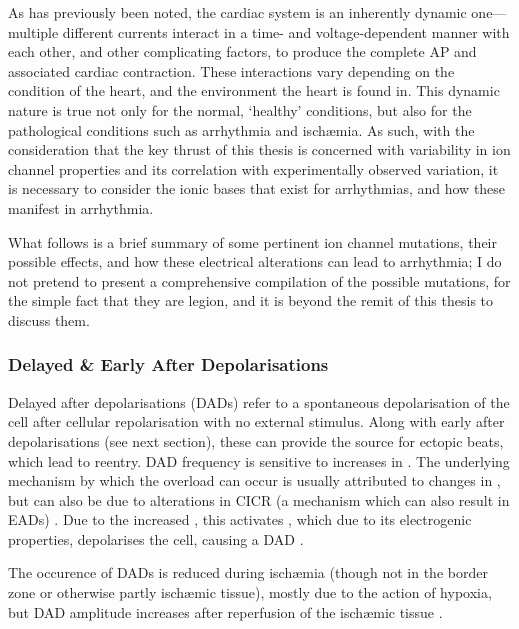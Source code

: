 \documentclass[../thesis-main.tex]{subfiles}
\begin{document}
As has previously been noted, the cardiac system is an inherently dynamic one---multiple different currents interact in a time- and voltage-dependent manner with each other, and other complicating factors, to produce the complete AP and associated cardiac contraction. These interactions vary depending on the condition of the heart, and the environment the heart is found in. This dynamic nature is true not only for the normal, `healthy' conditions, but also for the pathological conditions such as arrhythmia and isch\ae{}mia. As such, with the consideration that the key thrust of this thesis is concerned with variability in ion channel properties and its correlation with experimentally observed variation, it is necessary to consider the ionic bases that exist for arrhythmias, and how these manifest in arrhythmia.

What follows is a brief summary of some pertinent ion channel mutations, their possible effects, and how these electrical alterations can lead to arrhythmia; I do not pretend to present a comprehensive compilation of the possible mutations, for the simple fact that they are legion, and it is beyond the remit of this thesis to discuss them.

\subsubsection{Delayed \& Early After Depolarisations}
\label{subsubsec:dad-ead}
Delayed after depolarisations (DADs) refer to a spontaneous depolarisation of the cell after cellular repolarisation with no external stimulus. Along with early after depolarisations (see next section), these can provide the source for ectopic beats, which lead to reentry. DAD frequency is sensitive to increases in \cai{}. The underlying mechanism by which the \cai{} overload can occur is usually attributed to changes in \ica{}, but can also be due to alterations in CICR (a mechanism which can also result in EADs) \citep{Volders1997}. Due to the increased \cai{}, this activates \inaca{}, which due to its electrogenic properties, depolarises the cell, causing a DAD \citep{Clusin2003}.

The occurence of DADs is reduced during isch\ae{}mia (though not in the border zone or otherwise partly isch\ae{}mic tissue), mostly due to the action of hypoxia, but DAD amplitude increases after reperfusion of the isch\ae{}mic tissue \citep{Coetzee1987, Ferrier1985}.
\end{document}
